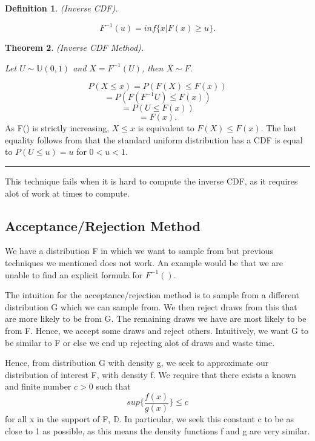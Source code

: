 \documentclass[twoside]{article}
\newcounter{lecnum}
\newtheorem{theorem}{Theorem}[lecnum]
\newtheorem{definition}[theorem]{Definition}
\newenvironment{proof}{{\bf Proof:}}{\hfill\rule{2mm}{2mm}}
\begin{document}
\begin{definition}
(Inverse CDF). 

$$
F^{-1}(u) = inf\{x|F(x) \geq u\}.
$$
\end{definition}

\begin{theorem}(Inverse CDF Method). 

Let $U \sim \mathbb{U}(0,1)$ and $X = F^{-1}(U)$, then $X \sim F$.
\end{theorem}

\begin{proof}
$$
P(X \leq x) = P(F(X) \leq F(x))
$$
$$
= P(F(F^{-1}U)\leq F(x))
$$
$$
= P(U \leq F(x))
$$
$$
= F(x).
$$
As F() is strictly increasing, $X \leq x$ is equivalent to $F(X) \leq F(x)$. The last equality follows from that the standard uniform distribution has a CDF is equal to $P(U \leq u) = u$ for $0 < u < 1$.
\end{proof}

This technique fails when it is hard to compute the inverse CDF, as it requires alot of work at times to compute.

\subsection{Acceptance/Rejection Method}


We have a distribution F in which we want to sample from but previous techniques we mentioned does not work. An example would be that we are unable to find an explicit formula for $F^{-1}()$. 

The intuition for the acceptance/rejection method is to sample from a different distribution G which we can sample from. We then reject draws from this that are more likely to be from G. The remaining draws we have are most likely to be from F. Hence, we accept some draws and reject others. Intuitively, we want G to be similar to F or else we end up rejecting alot of draws and waste time.

Hence, from distribution G with density g, we seek to approximate our distribution of interest F, with density f. We require that there exists a known and finite number $c>0$ such that
$$
sup\{\frac{f(x)}{g(x)}\} \leq c
$$
for all x in the support of F, $\mathbb{D}$. In particular, we seek this constant c to be as close to 1 as possible, as this means the density functions f and g are very similar.
\end{document}
